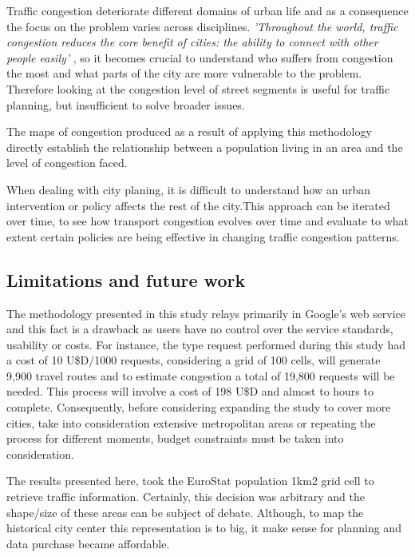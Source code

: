 \documentclass[a4paper]{jpconf}
\begin{document}
	Traffic congestion deteriorate different domains of urban life and as a consequence the focus on the problem varies across disciplines. \textit{'Throughout the world, traffic congestion reduces the core benefit of cities: the ability to connect with other people easily'} \parencite{Glaeser2011}, so it becomes crucial to understand who suffers from congestion the most and what parts of the city are more vulnerable to the problem. Therefore looking at the congestion level of street segments is useful for traffic planning, but insufficient to solve broader issues. \par
	
	The maps of congestion produced as a result of applying this methodology directly establish the relationship between a population living in an area and the level of congestion faced. \par
	
	When dealing with city planing, it is difficult to understand how an urban intervention or policy affects the rest of the city.This approach can be iterated over time, to see how transport congestion evolves over time and evaluate to what extent certain policies are being effective in changing traffic congestion patterns.\par
	
	
	\subsection{Limitations and future work}%
	The methodology presented in this study relays primarily in Google's web service and this fact is a drawback as users have no control over the service standards, usability or costs. For instance, the type request performed during this study had a cost of 10 U\$D/1000 requests, considering a grid of 100 cells, will generate 9,900 travel routes and to estimate congestion a total of 19,800 requests will be needed. This process will involve a cost of 198 U\$D and almost to hours to complete. Consequently, before considering expanding the study to cover more cities, take into consideration extensive metropolitan areas or repeating the process for different moments, budget constraints must be taken into consideration. \par
	The results presented here, took the EuroStat population 1km2 grid cell to retrieve traffic information. Certainly, this decision was arbitrary and the shape/size of these areas can be subject of debate. Although, to map the historical city center this representation is to big, it make sense for planning and data purchase became affordable.\par
	
\end{document}
